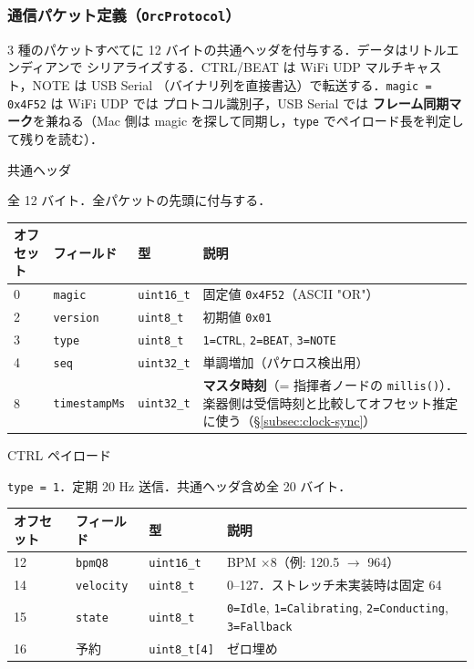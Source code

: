 \documentclass[lualatex,book,paper=a4paper,jafontsize=11.5pt,jafontscale=1.05]{jlreq}
\begin{document}
\subsubsection{通信パケット定義（\texttt{OrcProtocol}）}

3 種のパケットすべてに 12 バイトの共通ヘッダを付与する．データはリトルエンディアンで
シリアライズする．CTRL/BEAT は WiFi UDP マルチキャスト，NOTE は USB Serial
（バイナリ列を直接書込）で転送する．\texttt{magic = 0x4F52} は WiFi UDP では
プロトコル識別子，USB Serial では \textbf{フレーム同期マーク}を兼ねる（Mac 側は magic
を探して同期し，\texttt{type} でペイロード長を判定して残りを読む）．

\begin{apibox}{共通ヘッダ}
{\raggedright 全 12 バイト．全パケットの先頭に付与する．\par}\medskip
\begin{tabular}{l l l p{}}
\textbf{オフセット} & \textbf{フィールド} & \textbf{型} & \textbf{説明} \\
\midrule
0 & \texttt{magic}        & \texttt{uint16\_t} & 固定値 \texttt{0x4F52}（ASCII "OR"） \\
2 & \texttt{version}      & \texttt{uint8\_t}  & 初期値 \texttt{0x01} \\
3 & \texttt{type}         & \texttt{uint8\_t}  & \texttt{1=CTRL}, \texttt{2=BEAT}, \texttt{3=NOTE} \\
4 & \texttt{seq}          & \texttt{uint32\_t} & 単調増加（パケロス検出用） \\
8 & \texttt{timestampMs}  & \texttt{uint32\_t} & \textbf{マスタ時刻}（= 指揮者ノードの \texttt{millis()}）．楽器側は受信時刻と比較してオフセット推定に使う（\S\ref{subsec:clock-sync}） \\
\end{tabular}
\end{apibox}

\begin{apibox}{CTRL ペイロード}
{\raggedright \texttt{type = 1}．定期 20 Hz 送信．共通ヘッダ含め全 20 バイト．\par}\medskip
\begin{tabular}{l l l p{}}
\textbf{オフセット} & \textbf{フィールド} & \textbf{型} & \textbf{説明} \\
\midrule
12 & \texttt{bpmQ8}    & \texttt{uint16\_t}   & BPM $\times 8$（例: 120.5 $\to$ 964） \\
14 & \texttt{velocity} & \texttt{uint8\_t}    & 0--127．ストレッチ未実装時は固定 64 \\
15 & \texttt{state}    & \texttt{uint8\_t}    & \texttt{0=Idle}, \texttt{1=Calibrating}, \texttt{2=Conducting}, \texttt{3=Fallback} \\
16 & 予約              & \texttt{uint8\_t[4]} & ゼロ埋め \\
\end{tabular}
\end{apibox}
\end{document}
